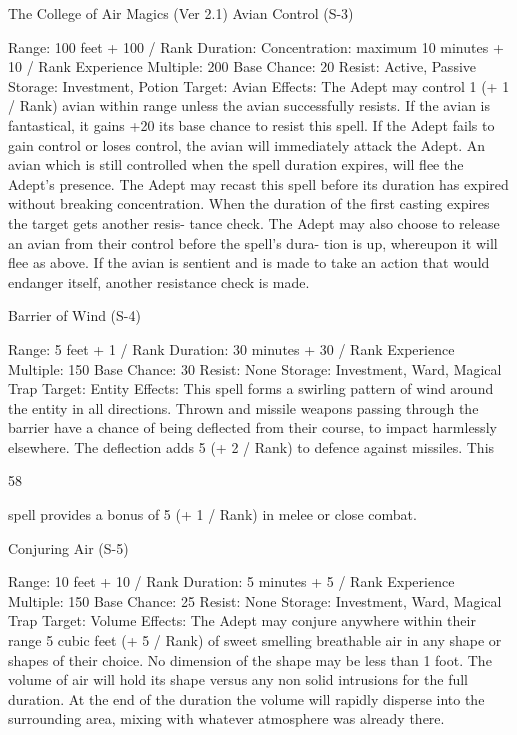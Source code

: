 \begin{Chapter}{The College of Air Magics (Ver 2.1)}
Avian Control (S-3) 

Range: 100 feet + 100 / Rank 
Duration:  Concentration:  maximum  10  minutes  + 
10 / Rank 
Experience Multiple: 200 
Base Chance: 20%
Resist: Active, Passive 
Storage: Investment, Potion 
Target: Avian 
Effects:  The  Adept  may  control  1  (+  1  /  Rank) 
avian  within  range  unless  the  avian  successfully 
resists. If the avian is fantastical, it gains +20%
its base chance to resist this spell. If the Adept fails 
to  gain  control  or  loses  control,  the  avian  will 
immediately  attack  the  Adept.  An  avian  which  is 
still controlled when the spell duration expires, will 
flee  the  Adept’s  presence.  The  Adept  may  recast 
this  spell  before  its  duration  has  expired  without 
breaking  concentration.  When  the  duration  of  the 
first  casting  expires  the  target  gets  another  resis-
tance check. The Adept may also choose to release 
an avian from their control before the spell’s dura-
tion  is  up,  whereupon  it  will  flee  as  above.  If  the 
avian is sentient and is made to take an action that 
would  endanger  itself,  another  resistance  check  is 
made. 

Barrier of Wind (S-4) 

Range: 5 feet + 1 / Rank 
Duration: 30 minutes + 30 / Rank 
Experience Multiple: 150 
Base Chance: 30%
Resist: None 
Storage: Investment, Ward, Magical Trap 
Target: Entity 
Effects: This spell forms a swirling pattern of wind 
around  the  entity  in  all  directions.  Thrown  and 
missile weapons passing through the barrier have a 
chance  of  being  deflected  from  their  course,  to 
impact  harmlessly  elsewhere.  The  deflection  adds 
5  (+  2  /  Rank)  to  defence  against  missiles.  This 

58 

spell provides a bonus of 5 (+ 1 / Rank) in melee or 
close combat. 

Conjuring Air (S-5) 

Range: 10 feet + 10 / Rank 
Duration: 5 minutes + 5 / Rank 
Experience Multiple: 150 
Base Chance: 25%
Resist: None 
Storage: Investment, Ward, Magical Trap 
Target: Volume 
Effects:  The  Adept  may  conjure  anywhere  within 
their  range  5  cubic  feet  (+  5  /  Rank)  of  sweet 
smelling  breathable  air  in  any  shape  or  shapes  of 
their  choice.  No  dimension  of  the  shape  may  be 
less  than  1  foot.  The  volume  of  air  will  hold  its 
shape  versus  any  non  solid  intrusions  for  the  full 
duration. At the end of the duration the volume will 
rapidly  disperse  into  the  surrounding  area,  mixing 
with whatever atmosphere was already there. 


\end{Chapter}
